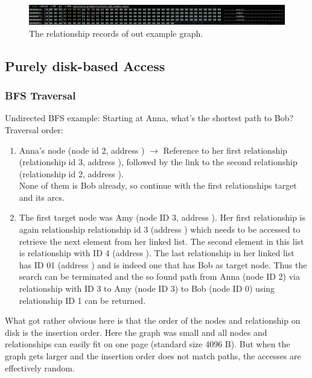 \documentclass[a4paper,10pt]{article}
\begin{document}
    \begin{figure}[htp]\label{property_keys}
        \begin{center}
            \includegraphics[keepaspectratio,height=1.2\textheight,width=1.2\textwidth]{img/04_example/property_key_strings.png}
        \end{center}
        \caption{The relationship records of out example graph.}
    \end{figure}
    
    \subsection{Purely disk-based Access}
        \subsubsection{BFS Traversal}
            Undirected BFS example: Starting at Anna, what's the shortest path to Bob? \\
            Traversal order:
            \begin{enumerate}
                \item Anna's node (node id 2, address ) $\rightarrow$ Reference to her first relationship (relationship id 3, address ), followed by the link to the second relationship (relationship id 2, address ). \\
             None of them is Bob already, so continue with the first relationships target and its arcs.
         \item The first target node was Amy (node ID 3, address ). Her first relationship is again relationship relationship id 3 (address ) which needs to be accessed to retrieve the next element from her linked list.
             The second element in this list is relationship with ID 4 (address ). 
                    The last relationship in her linked list has ID 01 (address ) and is indeed one that has Bob as target node. 
                    Thus the search can be terminated and the so found path from Anna (node ID 2) via relationship with ID 3 to Amy (node ID 3) to Bob (node ID 0) using relationship ID 1 can be returned.
            \end{enumerate}
            What got rather obvious here is that the order of the nodes and relationship on disk is the insertion order.
            Here the graph was small and all nodes and relationships can easily fit on one page (standard size 4096 B). 
            But when the graph gets larger and the insertion order does not match paths, the accesses are effectively random. 
                       
            
\nocite{*}
\printbibliography{}
\end{document}
